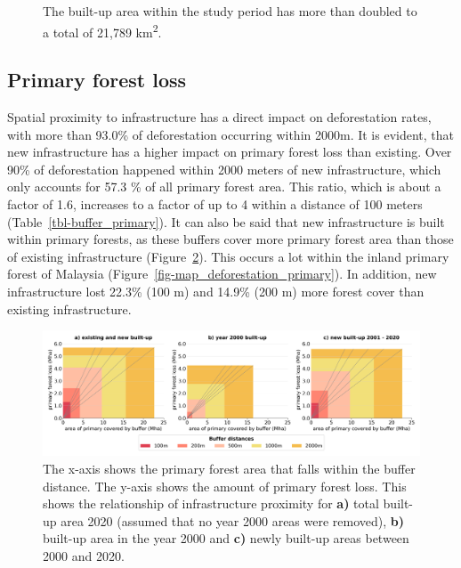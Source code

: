 \documentclass[
  letterpaper,
  DIV=11,
  numbers=noendperiod]{scrreprt}
\begin{document}
\begin{figure}
\begin{minipage}[t]{0.50\linewidth}
{{}

}

\end{minipage}%

\caption{\label{fig-forestloss_built_up}The built-up area within the
study period has more than doubled to a total of 21,789
km\textsuperscript{2}.}

\end{figure}

\hypertarget{primary-forest-loss}{%
\subsection{Primary forest loss}\label{primary-forest-loss}}

Spatial proximity to infrastructure has a direct impact on deforestation
rates, with more than 93.0\% of deforestation occurring within 2000m. It
is evident, that new infrastructure has a higher impact on primary
forest loss than existing. Over 90\% of deforestation happened within
2000 meters of new infrastructure, which only accounts for 57.3 \% of
all primary forest area. This ratio, which is about a factor of 1.6,
increases to a factor of up to 4 within a distance of 100 meters
(Table~\ref{tbl-buffer_primary}). It can also be said that new
infrastructure is built within primary forests, as these buffers cover
more primary forest area than those of existing infrastructure
(Figure~\ref{fig-primary_buffer}). This occurs a lot within the inland
primary forest of Malaysia (Figure~\ref{fig-map_deforestation_primary}).
In addition, new infrastructure lost 22.3\% (100 m) and 14.9\% (200 m)
more forest cover than existing infrastructure.

\begin{figure}

{\centering \includegraphics{text/../code/results/final_plots/deforestation_buffer_primary_forest.png}

}

\caption{\label{fig-primary_buffer}The x-axis shows the primary forest
area that falls within the buffer distance. The y-axis shows the amount
of primary forest loss. This shows the relationship of infrastructure
proximity for \textbf{a)} total built-up area 2020 (assumed that no year
2000 areas were removed), \textbf{b)} built-up area in the year 2000 and
\textbf{c)} newly built-up areas between 2000 and 2020.}

\end{figure}
\end{document}

